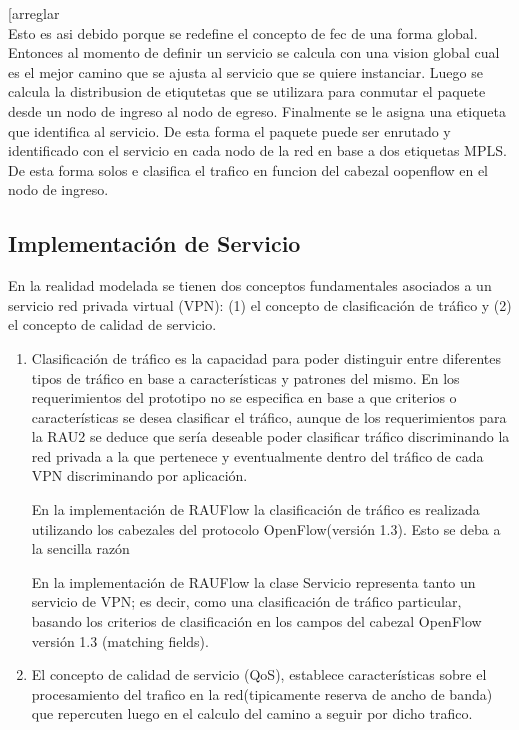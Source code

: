 [arreglar\\
Esto es asi debido porque se redefine el concepto de fec de una forma global. Entonces al momento de definir un servicio se calcula con una vision global cual es el mejor camino que se ajusta al servicio que se quiere instanciar. Luego se calcula la distribusion de etiqutetas que se utilizara para conmutar el paquete desde un nodo de ingreso al nodo de egreso. Finalmente se le asigna una etiqueta que identifica al servicio. De esta forma el paquete puede ser enrutado y identificado con el servicio en cada nodo de la red en base a dos etiquetas MPLS. De esta forma solos e clasifica el trafico en funcion del cabezal oopenflow en el nodo de ingreso.   


\subsection{Implementación de Servicio}

En la realidad modelada se tienen dos conceptos fundamentales asociados a un servicio red privada virtual (VPN): (1) el concepto de clasificación de tr\'afico y (2) el concepto de calidad de servicio.

\begin{enumerate}
\item Clasificación de tr\'afico es la capacidad para poder distinguir entre diferentes tipos de tr\'afico en base a caracter\'isticas y patrones del mismo. En los requerimientos del prototipo no se especifica en base a que criterios o características se desea clasificar el tr\'afico, aunque de los requerimientos para la RAU2 se deduce que ser\'ia deseable poder clasificar tr\'afico discriminando la red privada a la que pertenece y eventualmente dentro del tr\'afico de cada VPN discriminando por aplicaci\'on. 

En la implementaci\'on de RAUFlow la clasificaci\'on de tr\'afico es realizada utilizando los cabezales del protocolo OpenFlow(versi\'on 1.3). Esto se deba a la sencilla raz\'on 

En la implementaci\'on de RAUFlow la clase Servicio representa tanto un servicio de VPN; es decir,  como una clasificaci\'on de tr\'afico particular, basando los criterios de clasificaci\'on en los campos del cabezal OpenFlow versi\'on 1.3 (matching fields).

\item El concepto de calidad de servicio (QoS), establece características sobre el procesamiento del trafico en la red(tipicamente reserva de ancho de banda) que repercuten luego en el calculo del camino a seguir por dicho trafico.
\end{enumerate}

